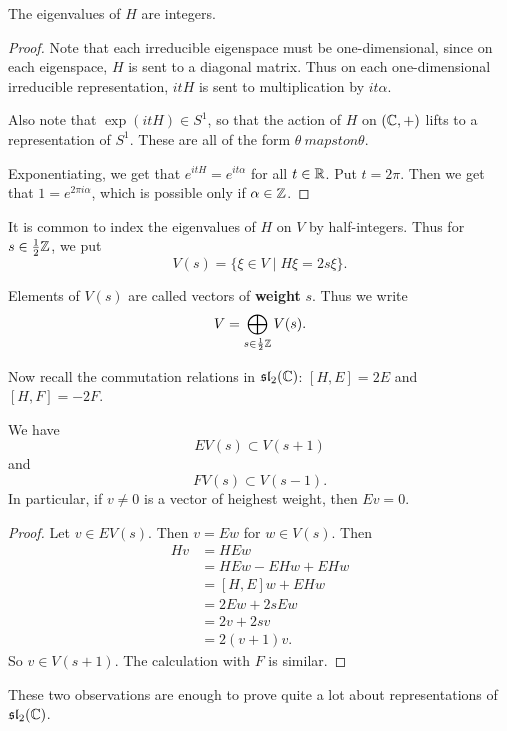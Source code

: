 \documentclass[11pt, english]{article}
\begin{document}
\begin{lemma}
  The eigenvalues of $H$ are integers.
\end{lemma}
\begin{proof}
Note that each irreducible eigenspace must be one-dimensional, since on each eigenspace, $H$ is sent to a diagonal matrix. Thus on each one-dimensional irreducible representation, $itH$ is sent to multiplication by $it\alpha$.

Also note that $\exp(itH) \in S^1$, so that the action of $H$ on $(\mathbb{C},+)$ lifts to a representation of $S^1$. These are all of the form $\theta \ mapsto n \theta$.

Exponentiating, we get that $e^{itH}=e^{it\alpha}$ for all $t \in \mathbb{R}$. Put $t=2\pi$. Then we get that $1=e^{2\pi i \alpha}$, which is possible only if $\alpha \in \mathbb{Z}$.
\end{proof}

It is common to index the eigenvalues of $H$ on $V$ by half-integers. Thus for $s \in \frac 12 \mathbb{Z}$, we put
$$
V(s) = \{ \xi \in V \mid H \xi = 2s \xi \}.
$$

Elements of $V(s)$ are called vectors of \textbf{weight} $s$. Thus we write
$$
V = \bigoplus_{s \in \frac 12 \mathbb{Z}} V(s).
$$

Now recall the commutation relations in $\mathfrak{sl}_2(\mathbb{C})$: $[H,E]=2E$ and $[H,F]=-2F$.

\begin{lemma}
  We have 
$$
EV(s) \subset V(s+1)
$$
and 
$$
FV(s) \subset V(s-1).
$$
In particular, if $v \neq 0$ is a vector of heighest weight, then $Ev = 0$.
\end{lemma}
\begin{proof}
Let $v \in EV(s)$. Then $v=Ew$ for $w \in V(s)$. Then
\begin{align*}
  Hv &= HEw \\
&= HEw - EHw + EHw \\
&= [H,E]w + EHw \\
&= 2Ew + 2sEw\\
&=2v+2sv \\
&=2(v+1)v.
\end{align*}
So $v \in V(s+1)$. The calculation with $F$ is similar.
\end{proof}

These two observations are enough to prove quite a lot about representations of $\mathfrak{sl}_2(\mathbb{C})$.
\end{document}
